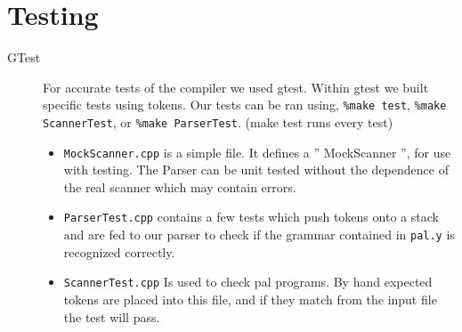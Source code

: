 \documentclass{article}
\begin{document}
\section*{Testing}
\begin{description}
	
\item[GTest]
	For accurate tests of the compiler we used gtest. Within gtest we
	built specific tests using tokens. Our tests can be ran using,
	\texttt{\%make test}, \texttt{\%make ScannerTest}, or \texttt{\%make ParserTest}.
	(make test runs every test)
	\begin{itemize}
		\item \texttt{MockScanner.cpp} is a simple file. It defines a 
		'' MockScanner '', for use with testing. The Parser can be unit tested
		without the dependence of the real scanner which may contain errors.
		\item \texttt{ParserTest.cpp} contains a few tests which push
		tokens onto a stack and are fed to our parser to check if the 
		grammar contained in  \texttt{pal.y} is recognized correctly.
		
		\item \texttt{ScannerTest.cpp} Is used to check pal programs.
		By hand expected tokens are placed into this file, and if they match
		from the input file the test will pass.
		

\end{itemize}
\end{description}
\end{document}
